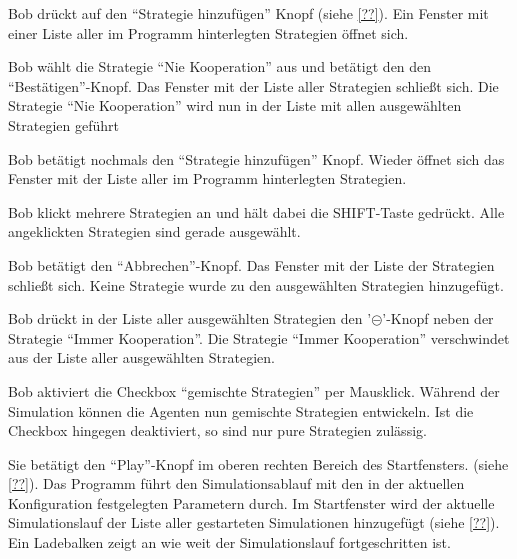 \documentclass[parskip=full,11pt]{scrartcl}
\begin{document}

%
{Bob drückt auf den \enquote{Strategie hinzufügen} Knopf (siehe \cref{??}).}
{Ein Fenster mit einer Liste aller im Programm hinterlegten Strategien öffnet sich.}

{Bob wählt die Strategie \enquote{Nie Kooperation} aus und betätigt den den \enquote{Bestätigen}-Knopf.}
{Das Fenster mit der Liste aller Strategien schließt sich. Die Strategie \enquote{Nie Kooperation} wird nun in der Liste mit allen ausgewählten Strategien geführt}

{Bob betätigt nochmals den  \enquote{Strategie hinzufügen} Knopf.}
{Wieder öffnet sich das Fenster mit der Liste aller im Programm hinterlegten Strategien.}

{Bob klickt mehrere Strategien an und hält dabei die SHIFT-Taste gedrückt.}
{Alle angeklickten Strategien sind gerade ausgewählt.}

{Bob betätigt den \enquote{Abbrechen}-Knopf.}
{Das Fenster mit der Liste der Strategien schließt sich. Keine Strategie wurde zu den ausgewählten Strategien hinzugefügt.}

{Bob drückt in der Liste aller ausgewählten Strategien den '\(\circleddash\)'-Knopf neben der Strategie \enquote{Immer Kooperation}.}
{Die Strategie \enquote{Immer Kooperation} verschwindet aus der Liste aller ausgewählten Strategien.}

{Bob aktiviert die Checkbox \enquote{gemischte Strategien} per Mausklick.}
{Während der Simulation können die Agenten nun gemischte Strategien entwickeln. Ist die Checkbox hingegen deaktiviert, so sind nur pure Strategien zulässig.}


{Sie betätigt den \enquote{Play}-Knopf im oberen rechten Bereich des Startfensters. (siehe \cref{??}).}
{Das Programm führt den Simulationsablauf mit den in der aktuellen Konfiguration festgelegten Parametern durch. Im Startfenster wird der aktuelle Simulationslauf der Liste aller gestarteten Simulationen hinzugefügt (siehe \cref{??}). Ein Ladebalken zeigt an wie weit der Simulationslauf fortgeschritten ist.}
\end{document}
